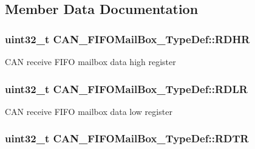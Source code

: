 \subsection{Member Data Documentation}
\hypertarget{struct_c_a_n___f_i_f_o_mail_box___type_def_a95890984bd67845015d40e82fb091c93}{
\subsubsection[{R\-D\-H\-R}]{ uint32\-\_\-t C\-A\-N\-\_\-\-F\-I\-F\-O\-Mail\-Box\-\_\-\-Type\-Def\-::\-R\-D\-H\-R}}\label{struct_c_a_n___f_i_f_o_mail_box___type_def_a95890984bd67845015d40e82fb091c93}
C\-A\-N receive F\-I\-F\-O mailbox data high register \hypertarget{struct_c_a_n___f_i_f_o_mail_box___type_def_ac7d62861de29d0b4fcf11fabbdbd76e7}{
\subsubsection[{R\-D\-L\-R}]{ uint32\-\_\-t C\-A\-N\-\_\-\-F\-I\-F\-O\-Mail\-Box\-\_\-\-Type\-Def\-::\-R\-D\-L\-R}}\label{struct_c_a_n___f_i_f_o_mail_box___type_def_ac7d62861de29d0b4fcf11fabbdbd76e7}
C\-A\-N receive F\-I\-F\-O mailbox data low register \hypertarget{struct_c_a_n___f_i_f_o_mail_box___type_def_a49d74ca8b402c2b9596bfcbe4cd051a9}{
\subsubsection[{R\-D\-T\-R}]{ uint32\-\_\-t C\-A\-N\-\_\-\-F\-I\-F\-O\-Mail\-Box\-\_\-\-Type\-Def\-::\-R\-D\-T\-R}}\label{struct_c_a_n___f_i_f_o_mail_box___type_def_a49d74ca8b402c2b9596bfcbe4cd051a9}
